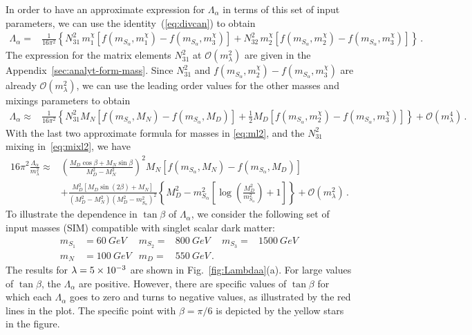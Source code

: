 In order to have an approximate expression for $\Lambda_\alpha$ in terms of this set of input parameters, we can use the identity~(\ref{eq:divcan}) to obtain
\begin{align*}
\Lambda_\alpha=&\frac{1}{16\pi^2}\left\{N_{31}^2\,m^\chi_1\left[ f(m_{S_\alpha},m^\chi_1)-f(m_{S_\alpha},m^\chi_3)\right]
                                +N_{32}^2\,m^\chi_2\left[f(m_{S_\alpha},m^\chi_2)-f(m_{S_\alpha},m^\chi_3)\right]\right\}\,.
\end{align*}
The expression for the matrix elements $N_{31}^2$ at $\mathcal{O}\left( m_{\lambda}^2 \right)$ are given in the Appendix~\ref{sec:analyt-form-mass}. Since $N_{31}^2$ and $f(m_{S_\alpha},m^\chi_2)-f(m_{S_\alpha},m^\chi_3)$ are already $\mathcal{O}\left( m_{\lambda}^2 \right)$, we can use the leading order values for the other masses and mixings parameters to obtain
\begin{align*}
  \Lambda_\alpha\approx&\frac{1}{16\pi^2}\left\{N_{31}^2 M_N\left[ f(m_{S_\alpha},M_N)-f(m_{S_\alpha},M_D)\right]
                                +\frac{1}{2}M_D\left[f(m_{S_\alpha},m^\chi_2)-f(m_{S_\alpha},m^\chi_3)\right]\right\}
+\mathcal{O}\left( m_\lambda^4 \right)\,.
\end{align*}
With the last two approximate formula for masses in \eqref{eq:ml2},  and the $N_{31}^2$  mixing in~\eqref{eq:mixl2}, we have
\begin{align}
\label{eq:lambdaappr}
16\pi^2\frac{\Lambda_\alpha}{m_{\lambda}^{2}}\approx & \left(\frac{M_{D} \cos\beta + M_{N} \sin\beta}{M_{D}^{2} - M_{N}^{2}}\right)^{2}
                                  M_{N}\left[f(m_{S_\alpha},M_N)-f(m_{S_\alpha},M_D)\right]\nonumber\\
&+\frac{ M_{D}^{2}\left[M_{D} \sin\left(2 \beta \right ) + M_{N}\right] 
        }{\left(M_{D}^{2} - M_{N}^{2}\right) \left(M_{D}^{2} - m_{S_\alpha}^{2}\right)^{2}} \left\{M_{D}^{2} - m_{S_\alpha}^{2} \left[\log{\left (\frac{M_{D}^{2}}{m_{S_\alpha}^{2}} \right )} + 1\right]\right\}+\mathcal{O}\left( m_\lambda^2 \right)\,.
\end{align}
%
To illustrate the dependence in $\tan\beta$ of $\Lambda_{\alpha}$, we consider the following set of input masses (SIM) compatible with singlet scalar dark matter:
\begin{align}
\label{eq:bp}
  m_{S_1}&=\SI{60}{GeV} & m_{S_2}=&\SI{800}{GeV} & m_{S_3}=&\SI{1500}{GeV}\, \nonumber\\
  m_N&=\SI{100}{GeV} & m_D=&\SI{550}{GeV}\,.
\end{align}
The results for $\lambda=\num{5E-3}$ are shown in
Fig.~\ref{fig:Lambdaa}(a). For large values of $\tan\beta$, the
$\Lambda_{\alpha}$ are positive. However, there are specific values of $\tan\beta$ for which each $\Lambda_{\alpha}$ 
goes to zero and turns to negative values, as illustrated by the red lines in the plot. 
The specific point with $\beta=\pi/6$ is depicted by the yellow stars in the figure.

